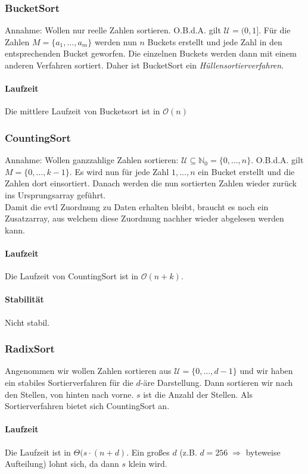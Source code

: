 \documentclass{scrartcl}
\begin{document}
\subsubsection{BucketSort}
Annahme: Wollen nur reelle Zahlen sortieren. O.B.d.A. gilt $\mathcal{U}=(0,1]$.
Für die Zahlen $M=\{a_1,\ldots,a_m\}$ werden nun $n$ Buckets erstellt und jede Zahl in den entsprechenden Bucket geworfen. Die einzelnen Buckets werden dann mit einem anderen Verfahren sortiert. Daher ist BucketSort ein \emph{Hüllensortierverfahren}.
\paragraph{Laufzeit}
Die mittlere Laufzeit von Bucketsort ist in $\mathcal{O}(n)$

\subsubsection{CountingSort}
Annahme: Wollen ganzzahlige Zahlen sortieren: $\mathcal{U}\subseteq\mathds N_0=\{0,\ldots,n\}$. O.B.d.A. gilt $M=\{0,\ldots,k-1\}$. Es wird nun für jede Zahl $1,\ldots,n$ ein Bucket erstellt und die Zahlen dort einsortiert. Danach werden die nun sortierten Zahlen wieder zurück ins Ursprungsarray geführt. \\
Damit die evtl Zuordnung zu Daten erhalten bleibt, braucht es noch ein Zusatzarray, aus welchem diese Zuordnung nachher wieder abgelesen werden kann.
\paragraph{Laufzeit}
Die Laufzeit von CountingSort ist in $\mathcal{O}(n+k)$.
\paragraph{Stabilität}
Nicht stabil.

\subsubsection{RadixSort}
Angenommen wir wollen Zahlen sortieren aus $\mathcal{U}=\{0,\ldots,d-1\}$ und wir haben ein stabiles Sortierverfahren für die $d$-äre Darstellung. Dann sortieren wir nach den Stellen, von hinten nach vorne. $s$ ist die Anzahl der Stellen. {\tiny Als Sortierverfahren bietet sich CountingSort an.}
\paragraph{Laufzeit}
Die Laufzeit ist in $\Theta(s\cdot(n+d)$. {\tiny Ein großes $d$ (z.B. $d=256 \; \Rightarrow$ byteweise Aufteilung) lohnt sich, da dann $s$ klein wird.}
\end{document}

